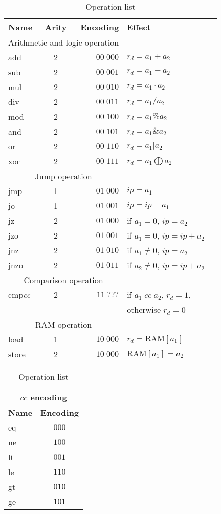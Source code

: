 \documentclass{scrartcl}
\begin{document}
\begin{table}
  \caption{Operation list}

  \begin{tabular}{lcrlr}
    \toprule
    \textbf{Name} & \textbf{Arity} & \textbf{Encoding} & \textbf{Effect}\\
    \midrule
    \midrule
    \multicolumn{3}{c}{Arithmetic and logic operation}\\
    \midrule
    add & 2 & \(00\;000\) & \(r_d=a_1+a_2\)\\
    sub & 2 & \(00\;001\) & \(r_d=a_1-a_2\)\\
    mul & 2 & \(00\;010\) & \(r_d=a_1\cdot a_2\)\\
    div & 2 & \(00\;011\) & \(r_d=a_1/a_2\)\\
    mod & 2 & \(00\;100\) & \(r_d=a_1\% a_2\)\\
    and & 2 & \(00\;101\) & \(r_d=a_1 \& a_2\)\\
    or & 2 & \(00\;110\) & \(r_d=a_1 | a_2\)\\
    xor & 2 & \(00\;111\) & \(r_d=a_1\bigoplus a_2\)\\
    \midrule
    \multicolumn{3}{c}{Jump operation}\\
    \midrule
    jmp & 1 & \(01\;000\) & \(ip=a_1\)\\
    jo & 1 & \(01\;001\) & \(ip=ip+a_1\)\\
    jz & 2 & \(01\;000\) & if \(a_1=0\), \(ip=a_2\)\\
    jzo & 2 & \(01\;001\) & if \(a_1=0\), \(ip=ip+a_2\)\\
    jnz & 2 & \(01\;010\) & if \(a_1\neq0\), \(ip=a_2\)\\
    jnzo & 2 & \(01\;011\) & if \(a_2\neq0\), \(ip=ip+a_2\)\\
    \midrule
    \multicolumn{3}{c}{Comparison operation}\\
    \midrule
    cmp\textit{cc} & 2 & \(11\;???\) & if \(a_1\;cc\;a_2\), \(r_d=1\),\\
                  &  &  & otherwise \(r_d=0\)\\
    \midrule
    \multicolumn{3}{c}{RAM operation}\\
    \midrule
    load & 1 & \(10\;000\) & \(r_d=\mathrm{RAM}[a_1]\)\\
    store & 2 & \(10\;000\) & \(\mathrm{RAM}[a_1]=a_2\)\\
    \bottomrule
  \end{tabular}
  \quad
  \begin{tabular}{lc}
    \multicolumn{2}{c}{\(cc\) encoding}\\
    \toprule
    \textbf{Name} & \textbf{Encoding}\\
    \midrule
    eq & \(000\)\\
    ne & \(100\)\\
    lt & \(001\)\\
    le & \(110\)\\
    gt & \(010\)\\
    ge & \(101\)\\
    \bottomrule
  \end{tabular}

\end{table}
\end{document}
